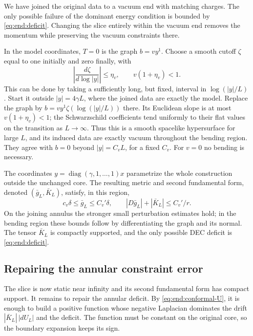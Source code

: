 We have joined the original data to a vacuum end with matching
charges.  The only possible failure of the dominant energy condition
is bounded by \eqref{eq:end:deficit}.  Changing the slice entirely
within the vacuum end removes the momentum while preserving the
vacuum constraints there.

In the model coordinates, $T=0$ is the graph $b=vy^1$.
Choose a smooth cutoff $\zeta$ equal to one initially and zero
finally, with
\[
 \left|\frac{d\zeta}{d\log |y|}\right|\le\eta_v,
 \qquad v(1+\eta_v)<1.
\]
This can be done by taking a sufficiently long, but fixed,
interval in $\log(|y|/L)$.  Start it outside $|y|=4\gamma L$,
where the joined data are exactly the model.  Replace the graph
by $b=vy^1\zeta(\log(|y|/L))$ there.  Its Euclidean slope is
at most $v(1+\eta_v)<1$; the Schwarzschild coefficients tend
uniformly to their flat values on the transition as $L\to\infty$.
Thus this is a smooth spacelike hypersurface for large $L$,
and its induced data are exactly vacuum throughout the bending
region.  They agree with $b=0$ beyond $|y|=C_vL$, for a fixed
$C_v$.  For $v=0$ no bending is necessary.

The coordinates $y=\operatorname{diag}(\gamma,1,\ldots,1)x$ parametrize
the whole construction outside the unchanged core.  The resulting
metric and second fundamental form, denoted $(\bar g_L,\bar K_L)$,
satisfy, in this region,
\begin{equation}\label{eq:end:bending-bounds}
 c_v\delta\le\bar g_L\le C_v'\delta,\qquad
 |D\bar g_L|+|\bar K_L|\le C_v'/r.
\end{equation}
On the joining annulus the stronger small perturbation estimates
hold; in the bending region these bounds follow by differentiating
the graph and its normal.  The tensor $\bar K_L$ is compactly
supported, and the only possible DEC deficit is
\eqref{eq:end:deficit}.

\subsection{Repairing the annular constraint error}

The slice is now static near infinity and its second fundamental
form has compact support.  It remains to repair the annular deficit.
By \eqref{eq:end:conformal-U}, it is enough to build a
positive function whose negative Laplacian dominates the drift
$|\bar K_L|\,|dU_L|$ and the deficit.  The function must be constant
on the original core, so the boundary expansion keeps its sign.


